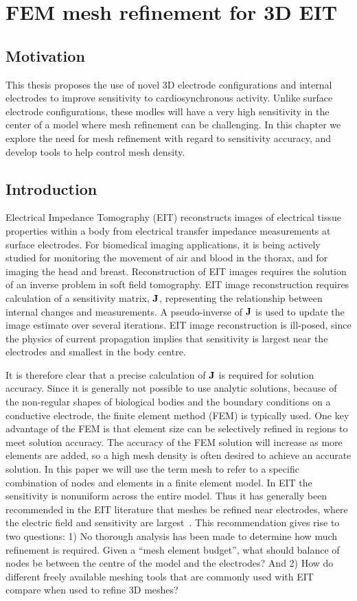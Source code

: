 \chapter{FEM mesh refinement for 3D EIT}
\label{chap:chapter-4}

\section{Motivation}
This thesis proposes the use of novel 3D electrode configurations 
and internal electrodes to improve sensitivity to 
cardiosynchronous activity. Unlike surface electrode configurations, these 
modles will have a very high 
sensitivity in the center of a model where mesh refinement can be challenging. 
In this chapter we explore the need for mesh refinement with regard
to sensitivity accuracy, and develop tools to help control mesh density. 

\section{Introduction}
Electrical Impedance Tomography (EIT) reconstructs images of 
electrical tissue properties within a body from electrical
transfer impedance measurements at surface electrodes. For
biomedical imaging applications, it is being actively studied
for monitoring
the movement of air and blood in the thorax, and for imaging
the head and breast. Reconstruction of EIT images requires
the solution of an inverse problem in soft field tomography.
EIT image reconstruction requires 
calculation of a sensitivity matrix, $\bf J$, representing the relationship between internal 
changes and measurements. A pseudo-inverse of $\bf J$ is used
to update the image estimate over several iterations. 
EIT image reconstruction is ill-posed, since the physics of
current propagation implies that sensitivity is largest near
the electrodes and smallest in the body centre.

It is therefore clear that a precise  calculation of $\bf J$ is
required for solution accuracy. Since it is generally not
possible to use analytic solutions, because of the non-regular
shapes of biological bodies and the boundary conditions on a
conductive electrode, the finite element method (FEM) is typically
used. 
One key advantage of the FEM is that element size can be
selectively refined in regions to meet solution accuracy. 
The accuracy of the FEM solution will increase as more elements are
added, so a high mesh density is often desired to achieve an 
accurate solution. 
In this paper we will use the term mesh to refer to a specific 
combination of nodes and elements in a finite element model. 
In EIT the sensitivity is nonuniform 
across the entire model.
Thus
it has generally been recommended in the EIT literature 
that meshes be refined near electrodes, where the electric 
field and sensitivity are largest~\parencite{adler_electrical_2017}. 
This recommendation gives rise to two questions: 
1) No thorough analysis has been made to determine how much 
refinement is required. Given a ``mesh element budget'', what should
balance of nodes be between the centre of the model and the electrodes? And 
2) How do different freely available meshing tools that are
commonly used with EIT compare when used to refine 3D meshes?


